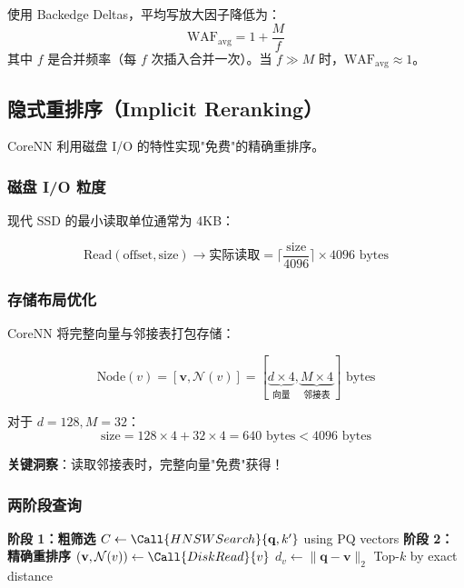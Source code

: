 \begin{theorem}[写放大降低]
使用 Backedge Deltas，平均写放大因子降低为：
\begin{equation}
\text{WAF}_{\text{avg}} = 1 + \frac{M}{f}
\end{equation}
其中 $f$ 是合并频率（每 $f$ 次插入合并一次）。当 $f \gg M$ 时，$\text{WAF}_{\text{avg}} \approx 1$。
\end{theorem}

\subsection{隐式重排序（Implicit Reranking）}

CoreNN 利用磁盘 I/O 的特性实现"免费"的精确重排序。

\subsubsection{磁盘 I/O 粒度}

现代 SSD 的最小读取单位通常为 4KB：

\begin{equation}
\text{Read}(\text{offset}, \text{size}) \rightarrow \text{实际读取} = \lceil \frac{\text{size}}{4096} \rceil \times 4096 \text{ bytes}
\end{equation}

\subsubsection{存储布局优化}

CoreNN 将完整向量与邻接表打包存储：

\begin{equation}
\text{Node}(v) = [\mathbf{v}, \mathcal{N}(v)] = [\underbrace{d \times 4}_{\text{向量}}, \underbrace{M \times 4}_{\text{邻接表}}] \text{ bytes}
\end{equation}

对于 $d=128, M=32$：
\begin{equation}
\text{size} = 128 \times 4 + 32 \times 4 = 640 \text{ bytes} < 4096 \text{ bytes}
\end{equation}

\textbf{关键洞察}：读取邻接表时，完整向量"免费"获得！

\subsubsection{两阶段查询}

\begin{algorithm}
\caption{CoreNN 磁盘查询}
\begin{algorithmic}[1]
    \State \textbf{阶段 1：粗筛选}
    \State $C \gets \Call{HNSWSearch}{\mathbf{q}, k'}$ using PQ vectors 
    \State \textbf{阶段 2：精确重排序}
        \State $(\mathbf{v}, \mathcal{N}(v)) \gets \Call{DiskRead}{v}$ 
        \State $d_v \gets \|\mathbf{q} - \mathbf{v}\|_2$ 
    \EndFor
    \State \Return Top-$k$ by exact distance
\EndProcedure
\end{algorithmic}
\end{algorithm}

